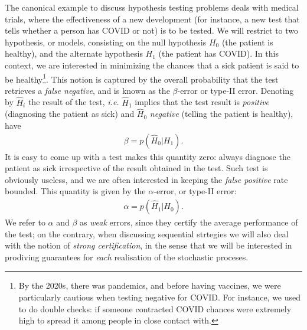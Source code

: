 The canonical example to discuss hypothesis testing problems deals with medical trials, where the effectiveness of a new development (for instance, a new test that tells whether a person has COVID or not) is to be tested. We will restrict to two hypothesis, or models, consisting on the null hypothesis $H_0$ (the patient is healthy), and the alternate hypothesis $H_1$ (the patient has COVID). In this context, we are interested in minimizing the chances that a sick patient is said to be healthy\footnote{By the 2020s, there was pandemics, and before having vaccines, we were particularly cautious when testing negative for COVID. For instance, we used to do double checks: if someone contracted COVID chances were extremely high to spread it among people in close contact with.}. This notion is captured by the overall probability that the test retrieves a \textit{false negative}, and is known as the $\beta$-error or type-II error. Denoting by $\hat{H}_i$ the result of the test, \textit{i.e.} $\hat{H}_1$ implies that the test result is \textit{positive} (diagnosing the patient as sick) and $\hat{H}_0$ \textit{negative} (telling the patient is healthy), have
\begin{align}
\beta = p(\hat{H}_0|H_1).
\end{align}
It is easy to come up with a test makes this quantity zero: always diagnose the patient as sick irrespective of the result obtained in the test. Such test is obviously useless, and we are often interested in keeping the \textit{false positive} rate bounded. This quantity is given by the $\alpha$-error, or type-II error:
\begin{align}
\alpha = p(\hat{H}_1|H_0).
\end{align}
We refer to $\alpha$ and $\beta$ as \textit{weak} errors, since they certify the average performance of the test; on the contrary, when discussing sequential strtegies we will also deal with the notion of \textit{strong certification}, in the sense that we will be interested in prodiving guarantees for \textit{each} realisation of the stochastic proceses.

